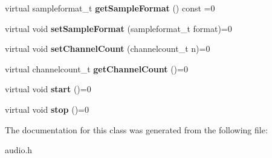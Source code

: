 \begin{DoxyCompactItemize}
\item 
\hypertarget{classNl_1_1Audio_adb6b16848b659bb3e655cd101242f735}{}virtual sampleformat\+\_\+t {\bfseries get\+Sample\+Format} () const =0\label{classNl_1_1Audio_adb6b16848b659bb3e655cd101242f735}

\item 
\hypertarget{classNl_1_1Audio_a60ca413bb266d807fdd99c4aa8bb8881}{}virtual void {\bfseries set\+Sample\+Format} (sampleformat\+\_\+t format)=0\label{classNl_1_1Audio_a60ca413bb266d807fdd99c4aa8bb8881}

\item 
\hypertarget{classNl_1_1Audio_a2c47e7835c7a17389fbfc467d8d5cb72}{}virtual void {\bfseries set\+Channel\+Count} (channelcount\+\_\+t n)=0\label{classNl_1_1Audio_a2c47e7835c7a17389fbfc467d8d5cb72}

\item 
\hypertarget{classNl_1_1Audio_a9acab6c6cdb76c81a3d53e2505ef407a}{}virtual channelcount\+\_\+t {\bfseries get\+Channel\+Count} ()=0\label{classNl_1_1Audio_a9acab6c6cdb76c81a3d53e2505ef407a}

\item 
\hypertarget{classNl_1_1Audio_a7e3523ce7ad5dee987f931f7b68a4581}{}virtual void {\bfseries start} ()=0\label{classNl_1_1Audio_a7e3523ce7ad5dee987f931f7b68a4581}

\item 
\hypertarget{classNl_1_1Audio_af84367ccd7daa7fc6c0bce2d9c7e2b14}{}virtual void {\bfseries stop} ()=0\label{classNl_1_1Audio_af84367ccd7daa7fc6c0bce2d9c7e2b14}

\end{DoxyCompactItemize}


The documentation for this class was generated from the following file\+:\begin{DoxyCompactItemize}
\item 
audio.\+h\end{DoxyCompactItemize}
